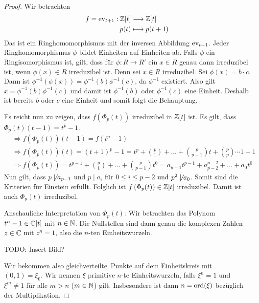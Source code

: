 \documentclass[12pt,a4paper]{scrartcl}
\begin{document}
\begin{proof}
	Wir betrachten
	\begin{align*}
		f = \operatorname{ev}_{t+1} : \mathbb Z[t] &\longrightarrow \mathbb Z[t] \\
		p(t) &\longmapsto p(t+1)
	\end{align*}
	Das ist ein Ringhomomorphismus mit der inversen Abbildung $\operatorname{ev}_{t-1}$. Jeder Ringhomomorphismus $\phi$ bildet Einheiten auf Einheiten ab. Falls $\phi$ ein Ringisomorphismus ist, gilt, dass für $\phi: R \to R'$ ein $x \in R$ genau dann irreduzibel ist, wenn $\phi(x) \in R$ irreduzibel ist.
	Denn sei $x \in R$ irreduzibel. Sei $\phi(x) = b\cdot c$. Dann ist $\phi^{-1}\left( \phi (x) \right) = \phi^{-1} (b) \phi^{-1} (c) $, da $\phi^{-1}$ existiert. Also gilt $x = \phi^{-1} (b) \phi^{-1} (c) $ und damit ist $\phi^{-1}(b)$ oder $\phi^{-1}(c)$ eine Einheit. Deshalb ist bereits $b$ oder $c$ eine Einheit und somit folgt die Behauptung.
	
	Es reicht nun zu zeigen, dass $f\left(\Phi_p(t) \right) $ irreduzibel in $\mathbb Z[t]$ ist. Es gilt, dass $\Phi_p(t)(t-1) = t^p - 1$.
	\begin{align*}
		&\Rightarrow f(\Phi_p(t))(t-1) = f(t^p - 1) \\
		&\Rightarrow f(\Phi_p(t)) (t) = (t + 1)^p - 1 = t^p + \binom{p}{1} + \dots + \binom{p}{p-1} t + \binom{p}{p}\cdots 1 - 1 \\
		&\Rightarrow f(\Phi_p(t)) = t^{p-1} + \binom{p}{1} + \dots + \binom{p}{p-1}t^0 = a_{p-1}t^{p-1} + a_{p-2}^{p-2} + \dots + a_0t^0
	\end{align*}
	Nun gilt, dass $p \not \mid a_{p-1}$ und $p \mid a_i$ für $0 \leq i \leq p-2$ und $p	^2 \not \mid a_0$. Somit sind die Kriterien für Einstein erfüllt. Folglich ist $f\left( \Phi_p(t) \right) \in \mathbb Z[t]$ irreduzibel. Damit ist auch $\Phi_p(t)$ irreduzibel.
	
	Anschauliche Interpretation von $\Phi_p(t)$: Wir betrachten das Polynom $t^n-1 \in \mathbb C[t]$ mit $n \in \mathbb N$. Die Nullstellen sind dann genau die komplexen Zahlen $z \in \mathbb C$ mit $z^n = 1$, also die $n$-ten Einheitswurzeln. 
	
	TODO: Insert Bild?
	
	Wir bekommen also \glqq gleichverteilte\grqq \ Punkte auf dem Einheitskreis mit $(0,1) = \xi_0$. Wir nennen $\xi$ primitive $n$-te Einheitswurzeln, falls $\xi^n = 1$ und $\xi^m \neq 1$ für alle $m > n$ ($m \in \mathbb N$) gilt. Insbesondere ist dann $n = \operatorname{ord} (\xi)$ bezüglich der Multiplikation.
\end{proof}
\end{document}
